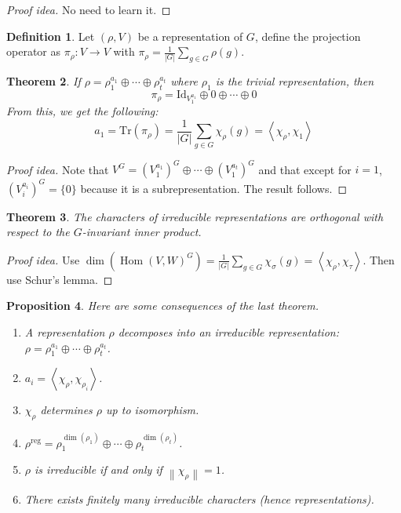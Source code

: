 \documentclass[paper=a4, fontsize=12pt]{scrartcl} %
\newtheorem{thm}{Theorem}[section]
\newtheorem{prop}[thm]{Proposition}
\theoremstyle{definition}
\newtheorem{defn}[thm]{Definition}
\theoremstyle{remark}
\DeclareMathOperator{\homm}{Hom}
\newcommand{\norm}[1]{\left\lVert #1 \right\rVert}
\newcommand{\inp}[2]{\left\langle #1, #2 \right\rangle}
\numberwithin{equation}{section} %
\numberwithin{figure}{section} %
\numberwithin{table}{section} %
\begin{document}
\begin{proof}[Proof idea]
	No need to learn it.
\end{proof}
\begin{defn}
	Let $(\rho, V)$ be a representation of $G$, define the projection operator as $\pi_{\rho} : V \rightarrow V$ with $\pi_{\rho} = \frac{1}{|G|} \sum_{g \in G} \rho(g)$.
\end{defn}
\begin{thm}
	If $\rho = \rho_1^{a_1} \oplus \cdots \oplus \rho_t^{a_t}$ where $\rho_1$ is the trivial representation, then $$\pi_{\rho} = \text{Id}_{V_1^{a_1}} \oplus 0 \oplus \cdots \oplus 0$$
	From this, we get the following:
	\[ a_1 = \text{Tr}(\pi_{\rho}) = \frac{1}{|G|}\sum_{g \in G} \chi_{\rho}(g) = \inp{\chi_{\rho}}{\chi_1} \]
\end{thm}
\begin{proof}[Proof idea]
	Note that $V^G = (V_1^{a_1})^G \oplus \cdots \oplus (V_1^{a_t})^G$ and that except for $i = 1$, $(V_i^{a_i})^G = \{0\}$ because it is a subrepresentation. The result follows.
\end{proof}
\begin{thm}
	The characters of irreducible representations are orthogonal with respect to the $G$-invariant inner product.
\end{thm}
\begin{proof}[Proof idea]
	Use $\dim(\homm(V,W)^G) = \frac{1}{|G|}\sum_{g \in G} \chi_{\sigma}(g) = \inp{\chi_{\rho}}{\chi_{\tau}}$. Then use Schur's lemma.
\end{proof}
\begin{prop}
	Here are some consequences of the last theorem.
	\begin{enumerate}
		\item A representation $\rho$ decomposes into an irreducible representation: $\rho = \rho_1^{a_1} \oplus \cdots \oplus \rho_t^{a_t}$.
		\item $a_i = \inp{\chi_{\rho}}{\chi_{\rho_i}}$.
		\item $\chi_{\rho}$ determines $\rho$ up to isomorphism.
		\item $\rho^{\text{reg}} = \rho_1^{\dim(\rho_1)} \oplus \cdots \oplus \rho_t^{\dim(\rho_t)}$.
		\item $\rho$ is irreducible if and only if $\norm{\chi_{\rho}} = 1$.
		\item There exists finitely many irreducible characters (hence representations).
	\end{enumerate}
\end{prop}
\end{document}

